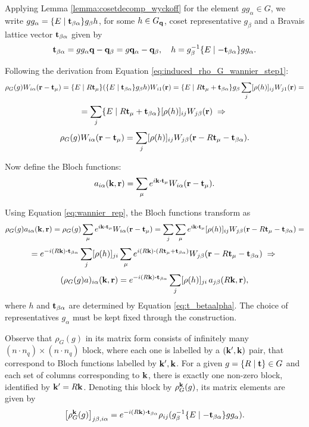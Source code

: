 \documentclass[12pt]{report}
\begin{document}
Applying Lemma \ref{lemma:cosetdecomp_wyckoff} for the element $g g_\alpha \in G$, we write $g g_\alpha = \{ E \mid {\vb{t}}_{\beta\alpha} \} g_\beta h$, for some $h \in G_{\vb{q}}$, coset representative $g_\beta$ and a Bravais lattice vector ${\vb{t}}_{\beta\alpha}$ given by
\begin{equation} \label{eq:t_betaalpha}
{\vb{t}}_{\beta\alpha} = gg_\alpha {\vb{q}} - {\vb{q}}_\beta = g {\vb{q}}_\alpha - {\vb{q}}_\beta, \quad
h = g_\beta^{-1} \{E\mid -{\vb{t}}_{\beta\alpha}\} g g_\alpha.
\end{equation}

Following the derivation from Equation \ref{eq:induced_rho_G_wannier_step1}:
$$
\rho_G(g) W_{i\alpha}({\vb{r}}-{\vb{t}}_\mu) =
\{ E \mid R{\vb{t}}_\mu \} \qty(\{ E \mid {\vb{t}}_{\beta\alpha} \} g_\beta h) W_{i1}({\vb{r}}) =
\{ E \mid R{\vb{t}}_\mu + {\vb{t}}_{\beta\alpha} \} g_\beta \sum_{j} [\rho(h)]_{ij} W_{j1}({\vb{r}}) =
$$
$$
= \sum_{j} \{ E \mid R{\vb{t}}_\mu + {\vb{t}}_{\beta\alpha} \} [\rho(h)]_{ij} W_{j\beta}({\vb{r}}) \; \Rightarrow \;
$$
\begin{equation} \label{eq:wannier_rep}
\rho_G(g) W_{i\alpha}({\vb{r}}-{\vb{t}}_\mu) = \sum_{j} [\rho(h)]_{ij} W_{j\beta}({\vb{r}} - R{\vb{t}}_\mu - {\vb{t}}_{\beta\alpha}).
\end{equation}

\n

Now define the Bloch functions:
\begin{equation} \label{eq:bloch_functions}
a_{i\alpha}(\k, \r) = \sum_{\mu} e^{i\k\vdot\t_\mu} W_{i\alpha}(\r-\t_\mu).
\end{equation}

Using Equation \ref{eq:wannier_rep}, the Bloch functions transform as
$$
\rho_G(g) a_{i\alpha}(\k,\r) =
\rho_G(g) \sum_{\mu} e^{i\k\vdot\t_\mu} W_{i\alpha}(\r-\t_\mu) =
\sum_{j} \sum_{\mu} e^{i\k\vdot\t_\mu} [\rho(h)]_{ij} W_{j\beta}(\r-R\t_\mu-\t_{\beta\alpha}) =
$$
$$
= e^{-i(R\k)\vdot\t_{\beta\alpha}} \sum_{j} [\rho(h)]_{ji} \sum_{\mu} e^{i(R\k)\vdot(R\t_\mu+\t_{\beta\alpha})} W_{j\beta}(\r-R\t_\mu-\t_{\beta\alpha}) \implies
$$
\begin{equation} \label{eq:bloch_rep}
(\rho_G(g) a)_{i\alpha}(\k,\r) = e^{-i(R\k)\vdot\t_{\beta\alpha}} \sum_{j} [\rho(h)]_{ji} \, a_{j\beta}(R\k, \r),
\end{equation}
where $h$ and ${\vb{t}}_{\beta\alpha}$ are determined by Equation \ref{eq:t_betaalpha}. The choice of representatives $g_\alpha$ must be kept fixed through the construction.

Observe that $\rho_G(g)$ in its matrix form consists of infinitely many $(n\cdot n_q)\times (n\cdot n_q)$ block, where each one is labelled by a $({\vb{k}}', {\vb{k}})$ pair, that correspond to Bloch functions labelled by ${\vb{k}}', {\vb{k}}$. For a given $g = \{ R \mid {\vb{t}} \} \in G$ and each set of columns corresponding to ${\vb{k}}$, there is exactly one non-zero block, identified by ${\vb{k}}' = R{\vb{k}}$. Denoting this block by $\rho_G^{\vb{k}}(g)$, its matrix elements are given by
$$
\qty[\rho_G^\k(g)]_{j\beta,i\alpha} = e^{-i(R\k)\vdot\t_{\beta\alpha}}\rho_{ij}(g_\beta^{-1}\sg{E}{-\t_{\beta\alpha}}gg_\alpha).
$$
\end{document}
